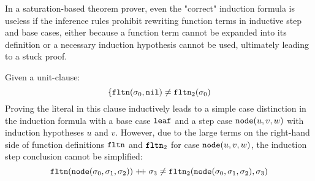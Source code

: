 In a saturation-based theorem prover, even the "correct" induction formula is useless if the inference rules prohibit rewriting function terms in inductive step and base cases, either because a function term cannot be expanded into its definition or a necessary induction hypothesis cannot be used, ultimately leading to a stuck proof.
\begin{example}
	Given a unit-clause:
	$$\{\mathtt{fltn}(\sigma_0,\mathtt{nil})\neq\mathtt{fltn}_2(\sigma_0)$$
	Proving the literal in this clause inductively leads to a simple case distinction in the induction formula with a base case $\mathtt{leaf}$ and a step case $\mathtt{node}(u,v,w)$ with induction hypotheses $u$ and $v$. However, due to the large terms on the right-hand side of function definitions $\mathtt{fltn}$ and $\mathtt{fltn}_2$ for case $\mathtt{node}(u,v,w)$, the induction step conclusion cannot be simplified:
	$$\mathtt{fltn}(\mathtt{node}(\sigma_0,\sigma_1,\sigma_2))\mathrel{ +\hspace{-1mm}+ }\sigma_3\neq\mathtt{fltn}_2(\mathtt{node}(\sigma_0,\sigma_1,\sigma_2),\sigma_3)$$
\end{example}
